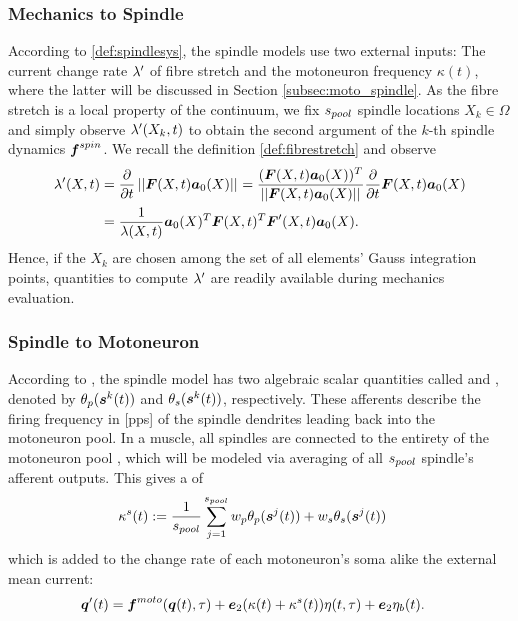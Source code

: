 \subsubsection{Mechanics to Spindle}
According to \ref{def:spindlesys}, the spindle models use two external inputs:
The current change rate $\lambda'$ of fibre stretch and the motoneuron frequency $\kappa(t)$, where the latter will be discussed in Section
\ref{subsec:moto_spindle}.
As the fibre stretch is a local property of the continuum, we fix ${s_{pool}}$ spindle locations $X_k\in\Omega$ and simply observe $\lambda'(X_k,t)$ to obtain the second
argument of the $k$-th spindle dynamics $\boldsymbol{f}^{spin}$.
We recall the definition \ref{def:fibrestretch} and observe 
\begin{align*}
	\lambda'(X,t) &= \frac{\partial }{\partial t}\left|\left|\boldsymbol{F}(X,t)\boldsymbol{a}_0(X)\right|\right|_{} = \frac{(\boldsymbol{F}(X,t)\boldsymbol{a}_0(X))^T}{\left|\left|\boldsymbol{F}(X,t)\boldsymbol{a}_0(X)\right|\right|_{}}\frac{\partial }{\partial t}\boldsymbol{F}(X,t)\boldsymbol{a}_0(X)\\
	  &= \frac{1}{\lambda(X,t)}\boldsymbol{a}_0(X)^T\boldsymbol{F}(X,t)^T\boldsymbol{F}'(X,t)\boldsymbol{a}_0(X).
\end{align*}
Hence, if the $X_k$ are chosen among the set of all elements' Gauss integration points, quantities to compute $\lambda'$ are readily available during mechanics evaluation.

\subsubsection{Spindle to Motoneuron}
According to \cite{Mileusnic2006}, the spindle model has two algebraic scalar quantities called  and ,
denoted by $\theta_p(\boldsymbol{s}^k(t))$ and $\theta_s(\boldsymbol{s}^k(t))$, respectively.
These afferents describe the firing frequency in [pps] of the spindle dendrites leading back into the motoneuron pool.
In a muscle, all spindles are connected to the entirety of the motoneuron pool , which will be modeled via averaging of all ${s_{pool}}$ spindle's afferent outputs.
This gives a  of
\begin{align}
	\kappa^s(t) &:= \frac{1}{{s_{pool}}}\sum\limits_{j=1}^{{s_{pool}}} w_p\theta_p(\boldsymbol{s}^j(t)) + w_s\theta_s(\boldsymbol{s}^j(t))
\end{align}
which is added to the change rate of each motoneuron's soma alike the external mean current:
\begin{align}
	\boldsymbol{q}'(t) &= \boldsymbol{f}^{moto}(\boldsymbol{q}(t),\tau) + \boldsymbol{e}_2(\kappa(t) + \kappa^s(t))\eta(t,\tau) + \boldsymbol{e}_2\eta_b(t).
\end{align}    


